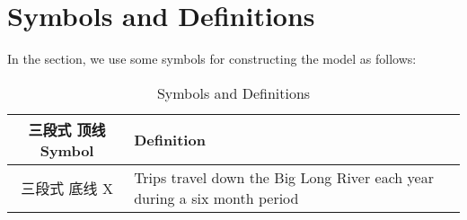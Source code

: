 \section{Symbols and Definitions }
In the section, we use some symbols for constructing the model as follows: 
\begin{table}[H]
	\begin{center}
		\caption{\label{tab:Symbols_total}Symbols and Definitions}
		\begin{tabular}{c p{12.5cm}}
			\toprule  三段式 顶线
			Symbol  & Deﬁnition \\
			\midrule 三段式 底线
			X &  Trips travel down the Big Long River each year during a six month period \\
			\bottomrule %
		\end{tabular}
	\end{center}
\end{table}